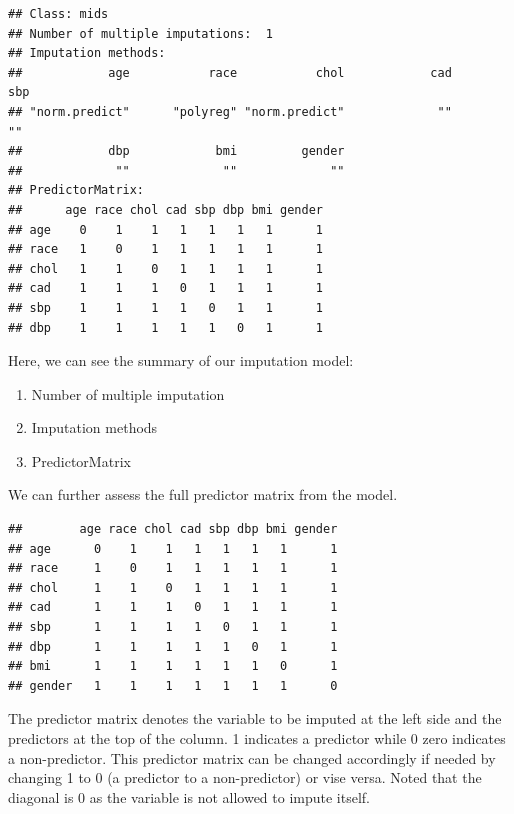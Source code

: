 \documentclass[
  10pt,
]{krantz}
\newenvironment{Shaded}{\begin{snugshade}}{\end{snugshade}}
\newcommand{\NormalTok}[1]{#1}
\newcommand{\SpecialCharTok}[1]{\textcolor[rgb]{0.00,0.00,0.00}{#1}}
\providecommand{\tightlist}{%
  \setlength{\itemsep}{0pt}\setlength{\parskip}{0pt}}
\begin{document}
\begin{verbatim}
## Class: mids
## Number of multiple imputations:  1 
## Imputation methods:
##            age           race           chol            cad            sbp 
## "norm.predict"      "polyreg" "norm.predict"             ""             "" 
##            dbp            bmi         gender 
##             ""             ""             "" 
## PredictorMatrix:
##      age race chol cad sbp dbp bmi gender
## age    0    1    1   1   1   1   1      1
## race   1    0    1   1   1   1   1      1
## chol   1    1    0   1   1   1   1      1
## cad    1    1    1   0   1   1   1      1
## sbp    1    1    1   1   0   1   1      1
## dbp    1    1    1   1   1   0   1      1
\end{verbatim}

Here, we can see the summary of our imputation model:

\begin{enumerate}
\def\labelenumi{\arabic{enumi}.}
\tightlist
\item
  Number of multiple imputation
\item
  Imputation methods
\item
  PredictorMatrix
\end{enumerate}

We can further assess the full predictor matrix from the model.

\begin{Shaded}
\end{Shaded}

\begin{verbatim}
##        age race chol cad sbp dbp bmi gender
## age      0    1    1   1   1   1   1      1
## race     1    0    1   1   1   1   1      1
## chol     1    1    0   1   1   1   1      1
## cad      1    1    1   0   1   1   1      1
## sbp      1    1    1   1   0   1   1      1
## dbp      1    1    1   1   1   0   1      1
## bmi      1    1    1   1   1   1   0      1
## gender   1    1    1   1   1   1   1      0
\end{verbatim}

The predictor matrix denotes the variable to be imputed at the left side and the predictors at the top of the column. 1 indicates a predictor while 0 zero indicates a non-predictor. This predictor matrix can be changed accordingly if needed by changing 1 to 0 (a predictor to a non-predictor) or vise versa. Noted that the diagonal is 0 as the variable is not allowed to impute itself.
\end{document}
